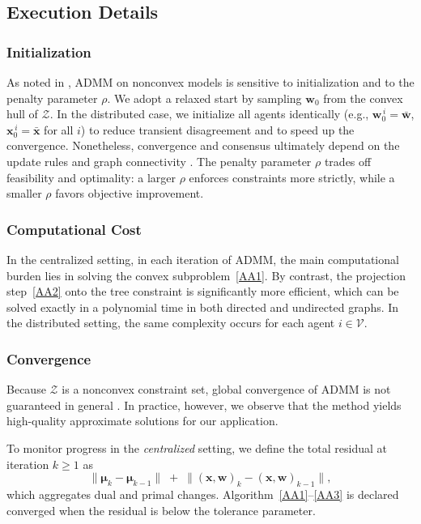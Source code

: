 \documentclass[11pt,a4paper]{article}
\theoremstyle{plain}
\theoremstyle{definition}
\theoremstyle{remark}
\begin{document}
	\subsection{Execution Details}
	
	\subsubsection{Initialization}
	As noted in \cite{boyd-biconvex,takapoui2020simple}, ADMM on nonconvex models is sensitive to initialization and to the penalty parameter $\rho$. We adopt a relaxed start by sampling $\mathbf{w}_0$ from the convex hull of $\mathcal{Z}$. In the distributed case, we initialize all agents identically (e.g., $\boldsymbol{w}_0^{\,i}=\bar{\boldsymbol{w}}$, $\boldsymbol{x}_0^{\,i}=\bar{\boldsymbol{x}}$ for all $i$) to reduce transient disagreement and to speed up the convergence. Nonetheless, convergence and consensus ultimately depend on the update rules and graph connectivity \cite{shi2014linear}. The penalty parameter $\rho$ trades off feasibility and optimality: a larger $\rho$ enforces constraints more strictly, while a smaller $\rho$ favors objective improvement. 
	
	\subsubsection{Computational Cost}
	In the centralized setting, in each iteration of ADMM, the main computational burden lies in solving the convex subproblem~\eqref{AA1}. By contrast, the projection step~\eqref{AA2} onto the tree constraint is significantly more efficient, which can be solved exactly in a polynomial time in both directed and undirected graphs. In the distributed setting, the same complexity occurs for each agent $i\in \mathcal{V}$. 
	\subsubsection{Convergence}
	Because $\mathcal{Z}$ is a nonconvex constraint set, global convergence of ADMM is not guaranteed in general \cite{boyd-biconvex}. In practice, however, we observe that the method yields high-quality approximate solutions for our application.
	
	To monitor progress in the \emph{centralized} setting, we define the total residual at iteration $k\ge 1$ as
	\begin{equation}
		\bigl\|\boldsymbol{\mu}_{k}-\boldsymbol{\mu}_{k-1}\bigr\|
		\;+\;
		\bigl\|(\boldsymbol{x},\boldsymbol{w})_{k}-(\boldsymbol{x},\boldsymbol{w})_{k-1}\bigr\|,
		\label{error_c}
	\end{equation}
	which aggregates dual and primal changes. Algorithm~\eqref{AA1}--\eqref{AA3} is declared converged when the residual is below the tolerance parameter.
	
\end{document}
